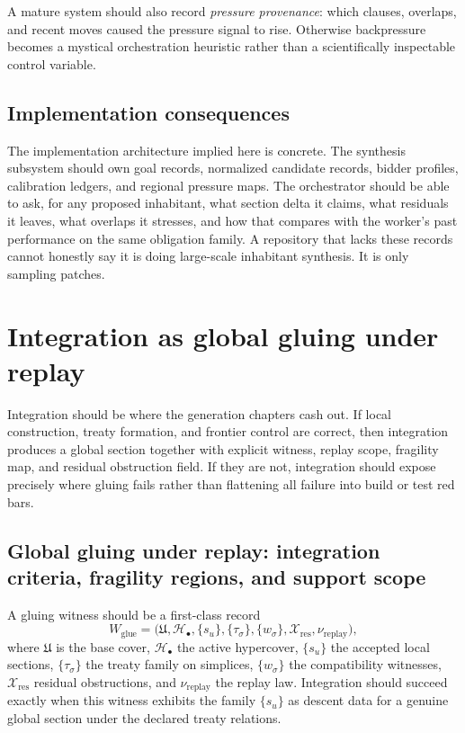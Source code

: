 \documentclass[11pt]{report}
\begin{document}
A mature system should also record \emph{pressure provenance}: which clauses, overlaps, and recent moves caused the pressure signal to rise. Otherwise backpressure becomes a mystical orchestration heuristic rather than a scientifically inspectable control variable.

\section{Implementation consequences}
The implementation architecture implied here is concrete. The synthesis subsystem should own goal records, normalized candidate records, bidder profiles, calibration ledgers, and regional pressure maps. The orchestrator should be able to ask, for any proposed inhabitant, what section delta it claims, what residuals it leaves, what overlaps it stresses, and how that compares with the worker's past performance on the same obligation family. A repository that lacks these records cannot honestly say it is doing large-scale inhabitant synthesis. It is only sampling patches.

\chapter{Integration as global gluing under replay}
Integration should be where the generation chapters cash out. If local construction, treaty formation, and frontier control are correct, then integration produces a global section together with explicit witness, replay scope, fragility map, and residual obstruction field. If they are not, integration should expose precisely where gluing fails rather than flattening all failure into build or test red bars.

\section{Global gluing under replay: integration criteria, fragility regions, and support scope}
A gluing witness should be a first-class record
\[
W_{\mathrm{glue}}
=
\bigl(
\mathfrak{U},
\mathcal{H}_\bullet,
\{s_u\},
\{\tau_\sigma\},
\{w_\sigma\},
\mathcal{X}_{\mathrm{res}},
\nu_{\mathrm{replay}}
\bigr),
\]
where $\mathfrak{U}$ is the base cover, $\mathcal{H}_\bullet$ the active hypercover, $\{s_u\}$ the accepted local sections, $\{\tau_\sigma\}$ the treaty family on simplices, $\{w_\sigma\}$ the compatibility witnesses, $\mathcal{X}_{\mathrm{res}}$ residual obstructions, and $\nu_{\mathrm{replay}}$ the replay law. Integration should succeed exactly when this witness exhibits the family $\{s_u\}$ as descent data for a genuine global section under the declared treaty relations.
\end{document}
